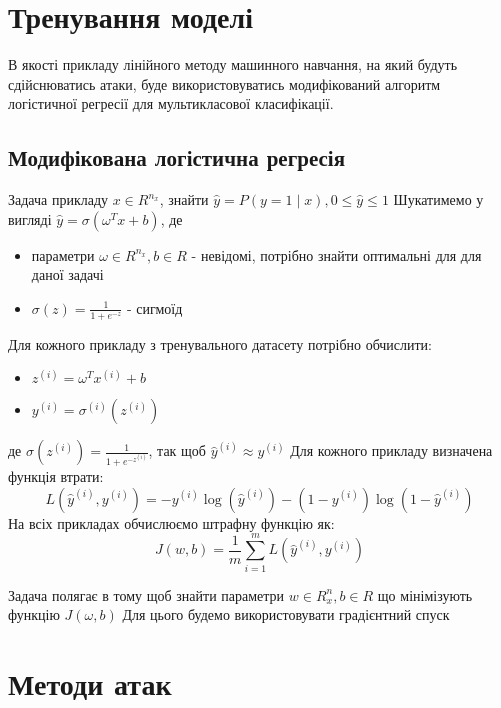 \documentclass[a4paper,14pt]{extreport}
\newcommand{\tran}{^{T}}
\newcommand{\ith}{^{(i)}}
\begin{document}
	\chapter{Тренування моделі}
	В якості прикладу лінійного методу машинного навчання, на який будуть сдійснюватись атаки, буде використовуватись модифікований алгоритм логістичної регресії для мультикласової класифікації.
	
	\section{Модифікована логістична регресія}
	Задача прикладу $x \in R^{n_x}$, знайти $\hat{y}=P(y = 1 \mid x), 0 \leq \hat{y} \leq 1$
	Шукатимемо у вигляді $\hat{y} = \sigma (\omega\tran x + b)$, де
	\begin{itemize}
		\item параметри $\omega \in R^{n_x}, b \in R$ - невідомі, потрібно знайти оптимальні для для даної задачі
		\item $\sigma(z) = \frac{1}{1+ e^{-z}}$ - сигмоїд
	\end{itemize}
	Для кожного прикладу з тренувального датасету потрібно обчислити:
	\begin{itemize}
		\item $ z\ith = \omega\tran x\ith + b $
		\item $ y\ith = \sigma\ith (z\ith) $
	\end{itemize}
	де $\sigma(z\ith) = \frac{1}{1 + e^{-z\ith}}$, так щоб $\hat{y}\ith \approx y\ith $ \newline
	Для кожного прикладу визначена функція втрати:
	$$L(\hat{y}\ith, y\ith) = -y\ith \log(\hat{y}\ith) - (1 - y\ith) \log(1 - \hat{y}\ith)$$
	На всіх прикладах обчислюємо штрафну функцію як:
	$$J(w, b) = \frac{1}{m} \sum_{i=1}^{m} L(\hat{y}\ith, y\ith)$$
	
	Задача полягає в тому щоб знайти параметри $w \in R^n_x, b\in R$ що мінімізують функцію $J(\omega, b)$
	Для цього будемо використовувати градієнтний спуск 
	
	
	


	\chapter{Методи атак} 
\end{document}
